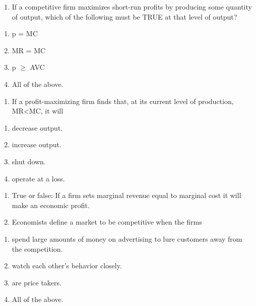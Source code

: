\documentclass[11pt,]{article}
\providecommand{\tightlist}{%
  \setlength{\itemsep}{0pt}\setlength{\parskip}{0pt}}
\begin{document}
\begin{enumerate}
\def\labelenumi{\arabic{enumi})}
\setcounter{enumi}{7}
\tightlist
\item
  If a competitive firm maximizes short-run profits by producing some
  quantity of output, which of the following must be TRUE at that level
  of output?
\end{enumerate}

\begin{enumerate}
\def\labelenumi{\Alph{enumi})}
\tightlist
\item
  p = MC
\item
  MR = MC
\item
  p \(\geq\) AVC
\item
  All of the above.
\end{enumerate}

\begin{enumerate}
\def\labelenumi{\arabic{enumi})}
\setcounter{enumi}{8}
\tightlist
\item
  If a profit-maximizing firm finds that, at its current level of
  production, MR\textless MC, it will
\end{enumerate}

\begin{enumerate}
\def\labelenumi{\Alph{enumi})}
\tightlist
\item
  decrease output.
\item
  increase output.
\item
  shut down.
\item
  operate at a loss.
\end{enumerate}

\begin{enumerate}
\def\labelenumi{\arabic{enumi})}
\setcounter{enumi}{9}
\item
  True or false: If a firm sets marginal revenue equal to marginal cost
  it will make an economic profit.
\item
  Economists define a market to be competitive when the firms
\end{enumerate}

\begin{enumerate}
\def\labelenumi{\Alph{enumi})}
\tightlist
\item
  spend large amounts of money on advertising to lure customers away
  from the competition.
\item
  watch each other's behavior closely.
\item
  are price takers.
\item
  All of the above.
\end{enumerate}
\end{document}
